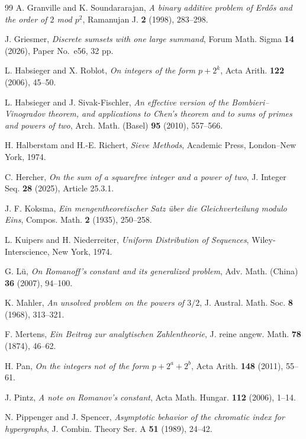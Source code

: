 \documentclass[11pt,reqno]{amsart}
\numberwithin{equation}{section}
\begin{document}
\begin{thebibliography}{99}
    A. Granville and K. Soundararajan, \emph{A binary additive problem of Erd\H{o}s and the order of $2$ mod $p^2$}, Ramanujan J. \textbf{2} (1998), 283--298.

    J. Griesmer, \emph{Discrete sumsets with one large summand}, Forum Math. Sigma \textbf{14} (2026), Paper No.~e56, 32 pp.

    L. Habsieger and X. Roblot, \emph{On integers of the form $p+2^k$}, Acta Arith. \textbf{122} (2006), 45--50.

    L. Habsieger and J. Sivak-Fischler, \emph{An effective version of the Bombieri--Vinogradov theorem, and applications to Chen's theorem and to sums of primes and powers of two}, Arch. Math. (Basel) \textbf{95} (2010), 557--566.

    H. Halberstam and H.-E. Richert, \emph{Sieve Methods}, Academic Press, London--New York, 1974.

    C. Hercher, \emph{On the sum of a squarefree integer and a power of two}, J. Integer Seq. \textbf{28} (2025), Article 25.3.1.

    J. F. Koksma, \emph{Ein mengentheoretischer Satz \"uber die Gleichverteilung modulo Eins}, Compos. Math. \textbf{2} (1935), 250--258.

    L. Kuipers and H. Niederreiter, \emph{Uniform Distribution of Sequences}, Wiley-Interscience, New York, 1974.

    G. L\"u, \emph{On Romanoff's constant and its generalized problem}, Adv. Math. (China) \textbf{36} (2007), 94--100.

    K. Mahler, \emph{An unsolved problem on the powers of $3/2$}, J. Austral. Math. Soc. \textbf{8} (1968), 313--321.

    F. Mertens, \emph{Ein Beitrag zur analytischen Zahlentheorie}, J. reine angew. Math. \textbf{78} (1874), 46--62.

    H. Pan, \emph{On the integers not of the form $p+2^a+2^b$}, Acta Arith. \textbf{148} (2011), 55--61.

    J. Pintz, \emph{A note on Romanov's constant}, Acta Math. Hungar. \textbf{112} (2006), 1--14.

    N. Pippenger and J. Spencer, \emph{Asymptotic behavior of the chromatic index for hypergraphs}, J. Combin. Theory Ser. A \textbf{51} (1989), 24--42.


\end{thebibliography}
\end{document}
